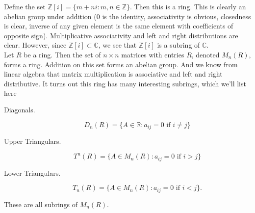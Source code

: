\documentclass[12pt,letterpaper]{algebra_book}
\newcommand{\ZZ}{\mathbb{Z}}
\theoremstyle{definition}
\begin{document}
    \textcolor{Blue!80!White}{Define the set $\ZZ[i] = \{m + ni: m, n \in \ZZ\}$. 
    Then this is a ring.} This is
    clearly an abelian group under addition (0 is the identity, associativity is
    obvious, closedness is clear, inverse of any given element is
    the same element with coefficients of opposite sign).
    Multiplicative associativity and left and right distributions
    are clear. However, since $\ZZ[i] \subset \mathbb{C}$, we see
    that $\ZZ[i]$ is a subring of $\mathbb{C}$.
    \\

    \textcolor{Green!80!White}{Let $R$ be a ring. Then the set of $n \times n$ matrices with
    entries $R$, denoted $M_{n}(R)$, forms a ring.} Addition on
    this set forms an abelian group. And we know from linear
    algebra that matrix multiplication is associative and left and
    right distributive.
    It turns out this ring has many interesting subrings, which
    we'll list here 
    \begin{description}
        \item[Diagonals.]
            \[
                D_n(R) = \{A \in \mathbb{R}: a_{ij} = 0 \text{ if } i \ne j\}
            \]
        \item[Upper Triangulars.]
            \[
                T^n(R) = \{A \in M_n(R): a_{ij} = 0 \text{ if } i > j\}
            \] 
        \item[Lower Triangulars.]  
        \[
            T_n(R) = \{A \in M_n(R): a_{ij} = 0 \text{ if } i < j\}.
        \]  
    \end{description}
    These are all subrings of $M_n(R)$.
    \\
    
\end{document}
